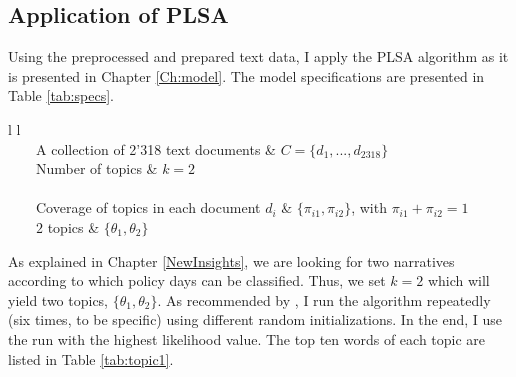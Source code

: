 \documentclass[11pt,a4paper,english,oneside]{book}
\newcommand{\tabitem}{~~\llap{\textbullet}~~}
\numberwithin{equation}{chapter}
\begin{document}
\subsection{Application of PLSA}

Using the preprocessed and prepared text data, I apply the PLSA algorithm as it is presented in Chapter \ref{Ch:model}. The model specifications are presented in Table \ref{tab:specs}.

\begin{table}[h] %
	\centering %
	\begin{tabular}{ l  l  } %
		\toprule %
		 \\
		\midrule %
		\tabitem A collection of 2'318  text documents & $C=\{d_1,...,d_{2318}\}$ \\
		\tabitem Number of topics & $k = 2$ \\
		\midrule
		 \\
		\midrule
		\tabitem Coverage of topics in each document $d_i$ & $\{\pi_{i1}, \pi_{i2}\}$, with $\pi_{i1}+\pi_{i2}=1$\\
		\tabitem $2$ topics & $\{\theta_1, \theta_2\}$\\ %
		\bottomrule %
	\end{tabular}
	\caption{Specification of PLSA model.} %
	\label{tab:specs} %
\end{table}

As explained in Chapter \ref{NewInsights}, we are looking for two narratives according to which policy days can be classified. Thus, we set $k=2$ which will yield two topics, $\{\theta_1, \theta_2\}$. As recommended by \citet[p. 363]{Zhai.2016}, I run the algorithm repeatedly (six times, to be specific) using different random initializations. In the end, I use the run with the highest likelihood value. The top ten words of each topic are listed in Table \ref{tab:topic1}.
\end{document}
